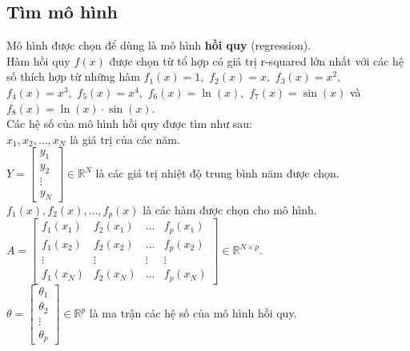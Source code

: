 \documentclass[a4paper]{article}
\begin{document}
\subsection{Tìm mô hình}
Mô hình được chọn để dùng là mô hình \textbf{hồi quy} (regression).\\ 
Hàm hồi quy $f \left( x \right)$ được chọn từ tổ hợp có giá trị r-squared lớn nhất với các hệ số thích hợp từ những hàm ${f_1}\left( x \right) = 1,$ ${f_2}\left( x \right) = x,$ ${f_3}\left( x \right) = {x^2},$ ${f_4}\left( x \right) = {x^3},$ ${f_5}\left( x \right) = {x^4},$ ${f_6}\left( x \right) = \ln \left( x \right),$ ${f_7}\left( x \right) = \sin \left( x \right)$ và ${f_8}\left( x \right) = \ln \left( x \right) \cdot \sin \left( x \right).$\\
Các hệ số của mô hình hồi quy được tìm như sau:\\
$x_1, x_2, ..., x_N$ là giá trị của các năm.\\
$Y = \left[ {\begin{array}{*{20}{c}}
  {{y_1}} \\ 
  {{y_2}} \\ 
   \vdots  \\ 
  {{y_N}} 
\end{array}} \right] \in {\mathbb{R}^N}$ là các giá trị nhiệt độ trung bình năm được chọn.\\
${f_1}\left( x \right),{f_2}\left( x \right), \ldots ,{f_p}\left( x \right)$ là các hàm được chọn cho mô hình.\\
$A = \left[ {\begin{array}{*{20}{c}}
  {{f_1}\left( {{x_1}} \right)}&{{f_2}\left( {{x_1}} \right)}& \ldots &{{f_p}\left( {{x_1}} \right)} \\ 
  {{f_1}\left( {{x_2}} \right)}&{{f_2}\left( {{x_2}} \right)}& \ldots &{{f_p}\left( {{x_2}} \right)} \\ 
   \vdots & \vdots & \vdots & \vdots  \\ 
  {{f_1}\left( {{x_N}} \right)}&{{f_2}\left( {{x_N}} \right)}& \ldots &{{f_p}\left( {{x_N}} \right)} 
\end{array}} \right] \in {\mathbb{R}^{N \times p}}.$\\
$\theta  = \left[ {\begin{array}{*{20}{c}}
  {{\theta _1}} \\ 
  {{\theta _2}} \\ 
   \vdots  \\ 
  {{\theta _p}} 
\end{array}} \right] \in {\mathbb{R}^p}$ là ma trận các hệ số của mô hình hồi quy.
\end{document}
